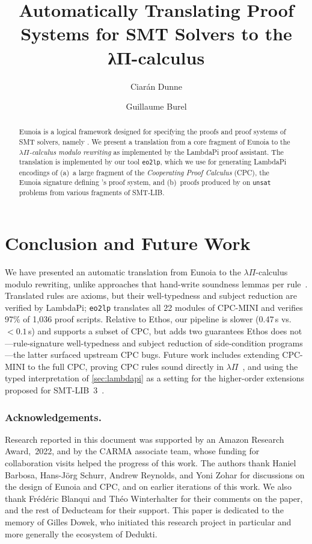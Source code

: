 \documentclass{llncs}
\title{%
	Automatically Translating Proof Systems
	for SMT Solvers to the λΠ-calculus}
\author{Ciarán Dunne\inst{1,3} \and Guillaume Burel\inst{2,3}}
\institute{\scriptsize INRIA, ENS Paris-Saclay;
  \and ensIIE;
  \and SAMOVAR, Télécom SudParis, Institut Polytechnique de Paris, 91120 Palaiseau, France}
\begin{document}
\maketitle


\begin{abstract}
	\noindent
	Eunoia is a logical framework designed for
	specifying the proofs and proof systems of SMT solvers,
	namely .
	We present a translation from a core fragment of Eunoia
	to the \emph{$λΠ$-calculus modulo rewriting} as implemented
	by the LambdaPi proof assistant.
	The translation is implemented by our tool \texttt{eo2lp},
	which we use for generating LambdaPi encodings of
	(a)~a large fragment of the
	\textit{Cooperating Proof Calculus} (CPC),
	the Eunoia signature defining 's proof system, and
	(b)~proofs produced by  on \texttt{unsat}
	problems from various fragments of SMT-LIB.
\end{abstract}









\section{Conclusion and Future Work}\label{sec:conclu}

We have presented an automatic translation from
Eunoia to the $\lambda\Pi$-calculus modulo rewriting,
unlike approaches that hand-write soundness lemmas per
rule~\cite{coltellacciReconstructionSMTProofs2024a,mohamed25leansmt}.
Translated rules are axioms, but their well-typedness
and subject reduction are verified by LambdaPi;
\texttt{eo2lp} translates all 22 modules of CPC-MINI
and verifies 97\% of 1{,}036 proof scripts.
Relative to Ethos, our pipeline is slower
(0.47\,s vs.\ ${<}0.1$\,s) and supports a subset of CPC,
but adds two guarantees Ethos does not---rule-signature
well-typedness and subject reduction of side-condition
programs---the latter surfaced upstream CPC bugs.
Future work includes extending CPC-MINI to the full CPC,
proving CPC rules sound directly in
$λΠ$~\cite{lachnitt24isarare}, and using the typed
interpretation of \autoref{sec:lambdapi} as a setting
for the higher-order extensions proposed for
SMT-LIB~3~\cite{barrettSMTLIB3Bringing,smt3-proposal}.

\subsubsection*{Acknowledgements.}
%
Research reported in this document was supported by an
Amazon Research Award,~2022, and by the CARMA associate
team, whose funding for collaboration visits helped the
progress of this work.
%
The authors thank Haniel Barbosa,
Hans-Jörg Schurr, Andrew Reynolds, and Yoni Zohar
for discussions on the design of Eunoia and CPC, and
on earlier iterations of this work.
%
We also thank Frédéric Blanqui and Théo Winterhalter for
their comments on the paper, and the rest of Deducteam
for their support.
%
This paper is dedicated to the memory of Gilles Dowek,
who initiated this research project in particular and
more generally the ecosystem of Dedukti.
\end{document}

